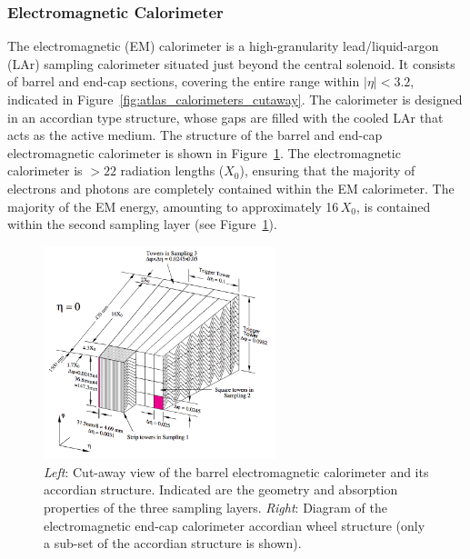 \subsubsection{Electromagnetic Calorimeter}
\label{sec:calo_em}

The electromagnetic (EM) calorimeter is a high-granularity lead/liquid-argon (LAr)
sampling calorimeter situated just beyond the central solenoid.
It consists of barrel and end-cap sections, covering the entire
range within $\lvert \eta \rvert < 3.2$, indicated in Figure~\ref{fig:atlas_calorimeters_cutaway}.
The calorimeter is designed in an accordian type structure, whose gaps are
filled with the cooled LAr that acts as the active medium.
The structure of the barrel and end-cap electromagnetic calorimeter
is shown in Figure~\ref{fig:em_calo_section}.
The electromagnetic calorimeter is $>22$ radiation lengths ($X_0$), ensuring
that the majority of electrons and photons are completely contained within the EM calorimeter.
The majority of the EM energy, amounting to approximately 16\,$X_0$, is contained
within the second sampling layer (see Figure~\ref{fig:em_calo_section}).

\begin{figure}[!htb]
    \begin{center}
        \includegraphics[width=0.6\textwidth]{figures/chapter2/calorimeters/atlas_em_calo_barrel}
        \caption{
            \textit{Left}: Cut-away view of the barrel electromagnetic calorimeter and its accordian
                structure. Indicated are
                the geometry and absorption properties of the three sampling layers.
            \textit{Right}: Diagram of the electromagnetic end-cap calorimeter accordian wheel structure
                (only a sub-set of the accordian structure is shown).
        }
        \label{fig:em_calo_section}
    \end{center}
\end{figure}

